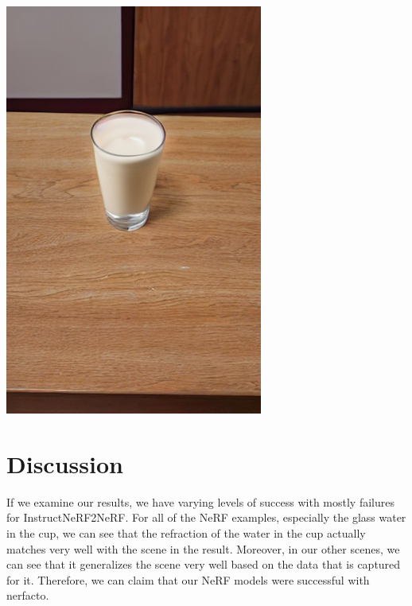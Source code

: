 \documentclass{article}
\begin{document}
\begin{tcbraster}[raster columns=2,raster equal height,raster column skip=0cm]
\begin{tcolorbox}
\begin{center}
            \end{center}
        \end{tcolorbox}
        \begin{tcolorbox}[
                          boxsep=0pt,
                          top=2pt,
                          left=4pt,
                          right=4pt,
                          colback=red!5!white,
                          colframe=red!75!black,
                          center title,
                          title=transform the water into milk
                          ]
        \begin{center}
            \includegraphics[scale=0.25]{images/milktransform.png}
        \end{center}
        \end{tcolorbox}
    \end{tcbraster}

\section{Discussion}

If we examine our results, we have varying levels of success with mostly failures for InstructNeRF2NeRF. For all of the NeRF examples, especially the glass water in the cup, we can see that the refraction of the water in the cup actually matches very well with the scene in the result. Moreover, in our other scenes, we can see that it generalizes the scene very well based on the data that is captured for it. Therefore, we can claim that our NeRF models were successful with nerfacto. 
\end{document}
